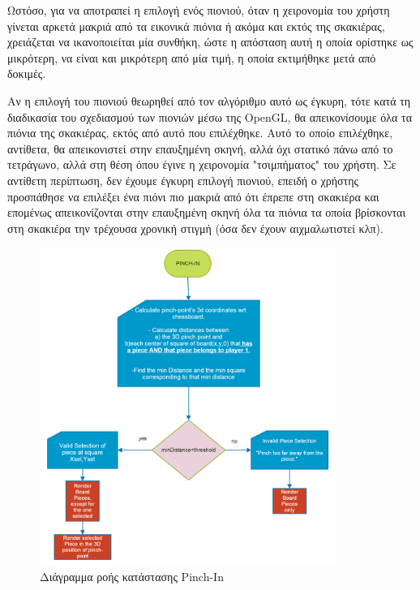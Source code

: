 Ωστόσο, για να αποτραπεί η επιλογή ενός πιονιού, όταν η χειρονομία του χρήστη γίνεται αρκετά μακριά από τα εικονικά πιόνια ή ακόμα και εκτός της σκακιέρας, χρειάζεται να ικανοποιείται μία συνθήκη, ώστε η απόσταση αυτή η οποία ορίστηκε ως μικρότερη, να είναι και μικρότερη από μία τιμή, η οποία εκτιμήθηκε μετά από δοκιμές.


Αν η επιλογή του πιονιού θεωρηθεί από τον αλγόριθμο αυτό ως έγκυρη, τότε κατά τη διαδικασία του σχεδιασμού των πιονιών μέσω της OpenGL, θα απεικονίσουμε όλα τα πιόνια της σκακιέρας, εκτός από αυτό που επιλέχθηκε. Αυτό το οποίο επιλέχθηκε, αντίθετα, θα απεικονιστεί στην επαυξημένη σκηνή, αλλά όχι στατικό πάνω από το τετράγωνο, αλλά στη θέση όπου έγινε η χειρονομία "τσιμπήματος" του χρήστη. Σε αντίθετη περίπτωση, δεν έχουμε έγκυρη επιλογή πιονιού, επειδή ο χρήστης προσπάθησε να επιλέξει ένα πιόνι πιο μακριά από ότι έπρεπε στη σκακιέρα και επομένως απεικονίζονται στην επαυξημένη σκηνή όλα τα πιόνια τα οποία βρίσκονται στη σκακιέρα την τρέχουσα χρονική στιγμή (όσα δεν έχουν αιχμαλωτιστεί κλπ).




\begin{figure}[H]
    \centering
    \includegraphics[width=0.86\textwidth]{Files/Figures/pinch_in.pdf}
    \caption[Διάγραμμα ροής κατάστασης Pinch-In]{Διάγραμμα ροής κατάστασης Pinch-In}
    \label{fig:pinch-in}
\end{figure}


